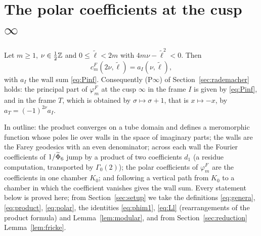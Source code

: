 \section{The polar coefficients at the cusp $\infty$}\label{sec:polarinf}

\begin{theorem}\label{thm:Pinf}
Let $m\ge1$, $\nu\in\frac12\mathbb{Z}$ and $0\le\tilde\ell<2m$ with $4m\nu-\tilde\ell^2<0$. Then
\[
c^F_m(2\nu,\tilde\ell)=a_I(\nu,\tilde\ell),
\]
with $a_I$ the wall sum \eqref{eq:Pinf}. Consequently (P$\infty$) of Section~\ref{sec:rademacher} holds: the principal part of $\varphi^F_m$ at the cusp $\infty$ in the frame $I$ is given by \eqref{eq:Pinf}, and in the frame $T$, which is obtained by $\sigma\mapsto\sigma+1$, that is $x\mapsto-x$, by $a_T=(-1)^{2\nu}a_I$.
\end{theorem}

In outline: the product converges on a tube domain and defines a meromorphic function whose poles lie over walls in the space of imaginary parts; the walls are the Farey geodesics with an even denominator; across each wall the Fourier coefficients of $1/\widetilde\Phi_6$ jump by a product of two coefficients $d_1$ (a residue computation, transported by $\Gamma_0(2)$); the polar coefficients of $\varphi^F_m$ are the coefficients in one chamber $K_0$; and following a vertical path from $K_0$ to a chamber in which the coefficient vanishes gives the wall sum. Every statement below is proved here; from Section~\ref{sec:setup} we take the definitions \eqref{eq:genera}, \eqref{eq:product}, \eqref{eq:polar}, the identities \eqref{eq:phim1}, \eqref{eq:Ll} (rearrangements of the product formula) and Lemma~\ref{lem:modular}, and from Section~\ref{sec:reduction} Lemma~\ref{lem:fricke}.

